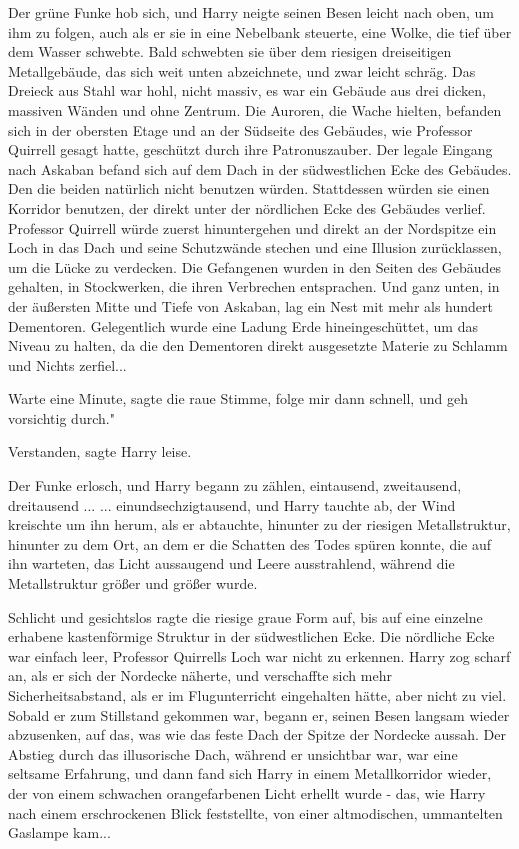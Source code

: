 Der grüne Funke hob sich, und Harry neigte seinen Besen leicht nach oben, um ihm
zu folgen, auch als er sie in eine Nebelbank steuerte, eine Wolke, die tief über
dem Wasser schwebte. Bald schwebten sie über dem riesigen dreiseitigen
Metallgebäude, das sich weit unten abzeichnete, und zwar leicht schräg. Das
Dreieck aus Stahl war hohl, nicht massiv, es war ein Gebäude aus drei dicken,
massiven Wänden und ohne Zentrum. Die Auroren, die Wache hielten, befanden sich
in der obersten Etage und an der Südseite des Gebäudes, wie Professor Quirrell
gesagt hatte, geschützt durch ihre Patronuszauber. Der legale Eingang nach
Askaban befand sich auf dem Dach in der südwestlichen Ecke des Gebäudes. Den die
beiden natürlich nicht benutzen würden. Stattdessen würden sie einen Korridor
benutzen, der direkt unter der nördlichen Ecke des Gebäudes verlief. Professor
Quirrell würde zuerst hinuntergehen und direkt an der Nordspitze ein Loch in das
Dach und seine Schutzwände stechen und eine Illusion zurücklassen, um die Lücke
zu verdecken. Die Gefangenen wurden in den Seiten des Gebäudes gehalten, in
Stockwerken, die ihren Verbrechen entsprachen. Und ganz unten, in der äußersten
Mitte und Tiefe von Askaban, lag ein Nest mit mehr als hundert Dementoren.
Gelegentlich wurde eine Ladung Erde hineingeschüttet, um das Niveau zu halten,
da die den Dementoren direkt ausgesetzte Materie zu Schlamm und Nichts
zerfiel...

\glqq Warte eine Minute\grqq{}, sagte die raue Stimme, \glqq folge mir dann
schnell, und geh vorsichtig durch."

\glqq Verstanden\grqq{}, sagte Harry leise.

Der Funke erlosch, und Harry begann zu zählen, eintausend, zweitausend,
dreitausend ... ... einundsechzigtausend, und Harry tauchte ab, der Wind
kreischte um ihn herum, als er abtauchte, hinunter zu der riesigen
Metallstruktur, hinunter zu dem Ort, an dem er die Schatten des Todes spüren
konnte, die auf ihn warteten, das Licht aussaugend und Leere ausstrahlend,
während die Metallstruktur größer und größer wurde.

Schlicht und gesichtslos ragte die riesige graue Form auf, bis auf eine einzelne
erhabene kastenförmige Struktur in der südwestlichen Ecke. Die nördliche Ecke
war einfach leer, Professor Quirrells Loch war nicht zu erkennen. Harry zog
scharf an, als er sich der Nordecke näherte, und verschaffte sich mehr
Sicherheitsabstand, als er im Flugunterricht eingehalten hätte, aber nicht zu
viel. Sobald er zum Stillstand gekommen war, begann er, seinen Besen langsam
wieder abzusenken, auf das, was wie das feste Dach der Spitze der Nordecke
aussah. Der Abstieg durch das illusorische Dach, während er unsichtbar war, war
eine seltsame Erfahrung, und dann fand sich Harry in einem Metallkorridor
wieder, der von einem schwachen orangefarbenen Licht erhellt wurde - das, wie
Harry nach einem erschrockenen Blick feststellte, von einer altmodischen,
ummantelten Gaslampe kam...

